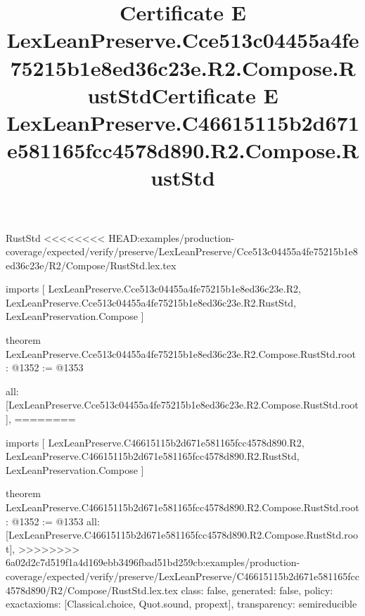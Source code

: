 \begin{lexlean}{RustStd}
<<<<<<<< HEAD:examples/production-coverage/expected/verify/preserve/LexLeanPreserve/Cce513c04455a4fe75215b1e8ed36c23e/R2/Compose/RustStd.lex.tex
\title{Certificate E LexLeanPreserve.Cce513c04455a4fe75215b1e8ed36c23e.R2.Compose.RustStd}
\begin{coremodule}
imports [
  LexLeanPreserve.Cce513c04455a4fe75215b1e8ed36c23e.R2,
  LexLeanPreserve.Cce513c04455a4fe75215b1e8ed36c23e.R2.RustStd,
  LexLeanPreservation.Compose
]

theorem LexLeanPreserve.Cce513c04455a4fe75215b1e8ed36c23e.R2.Compose.RustStd.root : @1352 := @1353 {
  all: [LexLeanPreserve.Cce513c04455a4fe75215b1e8ed36c23e.R2.Compose.RustStd.root],
========
\title{Certificate E LexLeanPreserve.C46615115b2d671e581165fcc4578d890.R2.Compose.RustStd}
\begin{coremodule}
imports [
  LexLeanPreserve.C46615115b2d671e581165fcc4578d890.R2,
  LexLeanPreserve.C46615115b2d671e581165fcc4578d890.R2.RustStd,
  LexLeanPreservation.Compose
]

theorem LexLeanPreserve.C46615115b2d671e581165fcc4578d890.R2.Compose.RustStd.root : @1352 := @1353 {
  all: [LexLeanPreserve.C46615115b2d671e581165fcc4578d890.R2.Compose.RustStd.root],
>>>>>>>> 6a02d2c7d519f1a4d169ebb3496fbad51bd259cb:examples/production-coverage/expected/verify/preserve/LexLeanPreserve/C46615115b2d671e581165fcc4578d890/R2/Compose/RustStd.lex.tex
  class: false,
  generated: false,
  policy: exact{axioms: [Classical.choice, Quot.sound, propext]},
  transparency: semireducible
}


\end{coremodule}}
\end{coremodule}
\end{lexlean}
